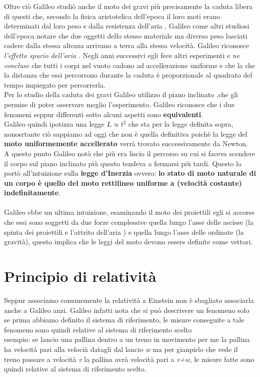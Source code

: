 \documentclass[a4paper,11pt,oneside]{book}
\theoremstyle{dispense}
\begin{document}
Oltre ciò Galileo studiò anche il moto dei gravi  più precisamente la caduta libera di questi che, secondo la fisica aristotelica dell'epoca il loro moti erano determinati dal loro peso e dalla resistenza dell'aria .
Galileo come altri studiosi dell'epoca notare che due oggetti dello stesso materiale ma diverso peso lasciati cadere dalla stessa altezza arrivano a terra alla stessa velocità. Galileo riconosce \textit{l'effetto spurio dell'aria} . Negli anni successivi egli fece altri esperimenti e \textit{ne concluse} che tutti i corpi nel vuoto cadono ad accellerazione uniforme e  che la che la distanza che essi percorrono durante la caduta è proporzionale al quadrato del tempo impiegato per percorrerla.\\
\newline
Per lo studio della caduta dei gravi Galileo utilizzo il piano inclinato ,che gli permise di poter osservare meglio l'esperimento. Galileo riconosce che i due fenomeni seppur differenti sotto alcuni aspetti sono \textbf{equivalenti}.\\

Galileo quindi ipotizza una legge $ L \propto t^2$ che sta per la legge definita sopra, nonosrtante ciò sappiamo ad oggi che non è quella definitiva poichè la legge del \textbf {moto uniformemente accellerato} verrà trovato successivamente da Newton.\\

A questo punto Galileo notò che più era liscio il percorso su cui si faceva scendere il corpo sul piano inclinato più questo tendeva a fermarsi più tardi.  Questo lo portò all'intuizione sulla \textbf{ legge d'Inerzia} ovvero:  \textbf{lo stato di moto naturale di un corpo è quello del moto rettilineo uniforme a (velocità costante) indefinitamente}. 
\\
\\
Galileo ebbe un ultima intuizione, esaminando il moto dei proiettili egli si accorse che essi sono soggetti da due forze complessive quella lungo l'asse delle ascisse (la spinta dei proiettili e l'attrito dell'aria ) e quella lungo l'asse delle ordinate (la gravità), questo implica che le leggi del moto devono essere definite come vettori.

\section{Principio di relatività}
Seppur associamo comunemente la relatività a Einstein non è sbagliato associarla anche a Galileo anzi. Galileo infatti nota che si può descrivere un fenomeno solo se prima abbiamo definito il sistema di riferimento, le misure conseguite a tale fenomeno sono quindi relative al sistema di riferimento scelto
\\
esempio:
se lancio una pallina dentro a un treno in movimento per me la pallina ha velocità pari alla velocià datagli dal lancio \textit{w} ma per gianpirlo che vede il treno passare a velocità \textit{v} la pallina avrà velocità pari a \textit{v+w}, le misure fatte sono quindi relative al sistema di riferimento scelto.\\
\end{document}
